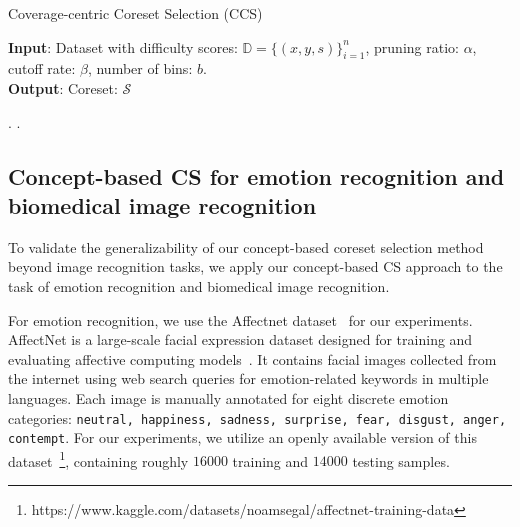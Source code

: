 \begin{algorithm}[t] 
\caption{Coverage-centric Coreset Selection (CCS) \cite{zheng2022coverage}} 
\label{alg:ccs}
\textbf{Input}: Dataset with difficulty scores: $\mathbb{D} = \{(x,y,s)\}_{i=1}^n$, pruning ratio: $\alpha$, cutoff rate: $\beta$, number of bins: $b$. \\
\textbf{Output}: Coreset: $\mathcal{S}$
\begin{algorithmic}
\STATE{}
    .
    .
\ENDWHILE
{}
\end{algorithmic}
\end{algorithm}




\subsection{Concept-based CS for emotion recognition and biomedical image recognition}
To validate the generalizability of our concept-based coreset selection method beyond image recognition tasks, we apply our concept-based CS approach to the task of emotion recognition and biomedical image recognition. 

For emotion recognition, we use the Affectnet dataset~\cite{mollahosseini2017affectnet} for our experiments. 
AffectNet is a large-scale facial expression dataset designed for training and evaluating affective computing models~\cite{wang2022systematic}. 
It contains facial images collected from the internet using web search queries for emotion-related keywords in multiple languages. 
Each image is manually annotated for eight discrete emotion categories: \texttt{neutral, happiness, sadness, surprise, fear, disgust, anger, contempt}. For our experiments, we utilize an openly available version of this dataset~\footnote{https://www.kaggle.com/datasets/noamsegal/affectnet-training-data}, containing roughly $16000$ training and $14000$ testing samples. 

